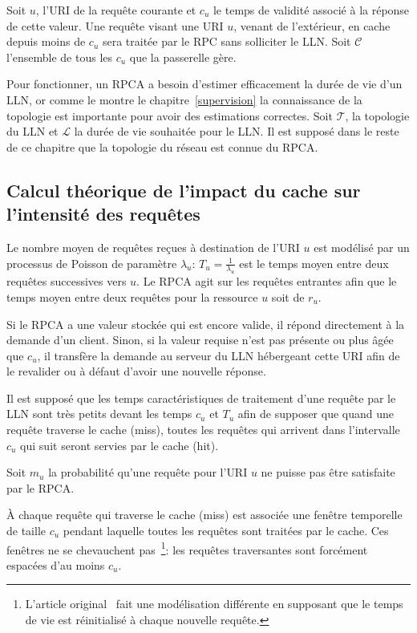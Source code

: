 Soit $u$, l'\ac{URI} de la requête courante et $c_u$ le temps de validité associé à la réponse de cette valeur.
Une requête visant une \ac{URI} $u$, venant de l'extérieur, en cache depuis moins de $c_u$ sera traitée par le \ac{RPC} sans solliciter le \ac{LLN}.
Soit $\mathcal{C}$ l'ensemble de tous les $c_u$ que la passerelle gère.

Pour fonctionner, un \ac{RPCA} a besoin d'estimer efficacement la durée de vie d'un \ac{LLN}, or comme le montre le chapitre~\ref{supervision} la connaissance de la topologie est importante pour avoir des estimations correctes.
Soit $\mathcal{T}$, la topologie du \ac{LLN} et $\mathcal{L}$ la durée de vie souhaitée pour le \ac{LLN}.
Il est supposé dans le reste de ce chapitre que la topologie du réseau est connue du \ac{RPCA}.

\subsection{Calcul théorique de l'impact du cache sur l'intensité des requêtes}
\label{cache:simple}

Le nombre moyen de requêtes reçues à destination de l'\ac{URI} $u$ est modélisé par un processus de Poisson de paramètre $\lambda_u$: $T_u = \frac{1}{\lambda_u}$ est le temps moyen entre deux requêtes successives vers $u$.
Le \ac{RPCA} agit sur les requêtes entrantes afin que le temps moyen entre deux requêtes pour la ressource $u$ soit de $r_u$.

Si le \ac{RPCA} a une valeur stockée qui est encore valide, il répond directement à la demande d'un client.
Sinon, si la valeur requise n'est pas présente ou plus âgée que $c_u$, il transfère la demande au serveur du \ac{LLN} hébergeant cette \ac{URI} afin de le revalider ou à défaut d'avoir une nouvelle réponse.

Il est supposé que les temps caractéristiques de traitement d'une requête par le \ac{LLN} sont très petits devant les temps $c_u$ et $T_u$ afin de supposer que quand une requête traverse le cache (miss), toutes les requêtes qui arrivent dans l'intervalle $c_u$ qui suit seront servies par le cache (hit).

Soit $m_u$ la probabilité qu'une requête pour l'\ac{URI} $u$ ne puisse pas être satisfaite par le \ac{RPCA}.

À chaque requête qui traverse le cache (miss) est associée une fenêtre temporelle de taille $c_u$ pendant laquelle toutes les requêtes sont traitées par le cache.
Ces fenêtres ne se chevauchent pas~\footnote{L'article original~\cite{leone2013optimizing} fait une modélisation différente en supposant que le temps de vie est réinitialisé à chaque nouvelle requête.}: les requêtes traversantes sont forcément espacées d'au moins $c_u$.

